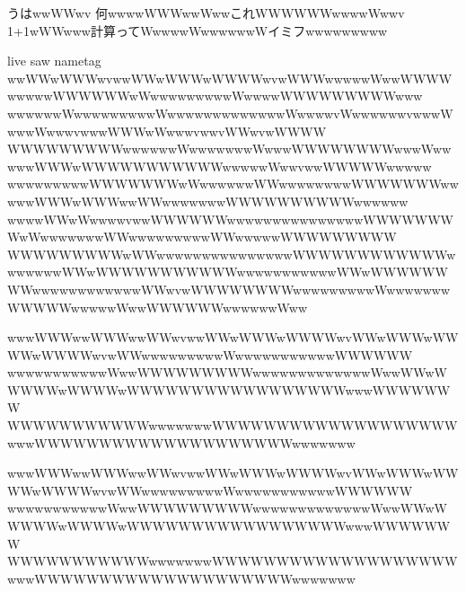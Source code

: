 \documentclass[a4paper]{article}
\begin{document}
\begin{execgrass}
うはwwWWwv
何wwwwWWWwwWwwこれWWWWWWwwwwWwwv
1+1wWWwww計算ってWwwwwWwwwwwwWイミフwwwwwwwww
\end{execgrass}

\begin{execgrasswithinput}{live saw nametag}
wwWWwWWWwvwwWWwWWWwWWWWwvwWWWwwwwwWwwWWWWwwwwwWWWWWWwWwwwwwwwwwWwwwwWWWWWWWWWwww
wwwwwwWwwwwwwwwwWwwwwwwwwwwwwwWwwwwvWwwwwwwvwwwWwwwWwwwvwwwWWWwWwwwvwwvWWwvwWWWW
WWWWWWWWWwwwwwwWwwwwwwwWwwwWWWWWWWWwwwWwwwwwWWWwWWWWWWWWWWWwwwwwWwwvwwWWWWWwwwww
wwwwwwwwwWWWWWWWwWwwwwwwWWwwwwwwwwWWWWWWWwwwwwWWWwWWWwwWWwwwwwwwWWWWWWWWWWwwwwww
wwwwWWwWwwwwvwwWWWWWWwwwwwwwwwwwwwwwWWWWWWWWwWwwwwwwwWWwwwwwwwwwWWwwwwwWWWWWWWWW
WWWWWWWWWwWWwwwwwwwwwwwwwwwWWWWWWWWWWWWwwwwwwwWWwWWWWWWWWWWWwwwwwwwwwwwWWwWWWWWW
WWwwwwwwwwwwwwWWwvwWWWWWWWWwwwwwwwwwWwwwwwwwWWWWWwwwwwWwwWWWWWWwwwwwwWww
\end{execgrasswithinput}

\begin{execgrass}
wwwWWWwwWWWwwWWwvwwWWwWWWwWWWWwvWWwWWWwWWWWwWWWWwvwWWwwwwwwwwwWwwwwwwwwwwwWWWWWW
wwwwwwwwwwwWwwWWWWWWWWWwwwwwwwwwwwwwWwwWWwWWWWWwWWWWwWWWWWWWWWWWWWWWWWwwwWWWWWWW
WWWWWWWWWWWwwwwwwwWWWWWWWWWWWWWWWWWWWwwwWWWWWWWWWWWWWWWWWWWWwwwwwww
\end{execgrass}

{\ttfamily\begin{execgrass*}
wwwWWWwwWWWwwWWwvwwWWwWWWwWWWWwvWWwWWWwWWWWwWWWWwvwWWwwwwwwwwwWwwwwwwwwwwwWWWWWW
wwwwwwwwwwwWwwWWWWWWWWWwwwwwwwwwwwwwWwwWWwWWWWWwWWWWwWWWWWWWWWWWWWWWWWwwwWWWWWWW
WWWWWWWWWWWwwwwwwwWWWWWWWWWWWWWWWWWWWwwwWWWWWWWWWWWWWWWWWWWWwwwwwww
\end{execgrass*}}
\end{document}
